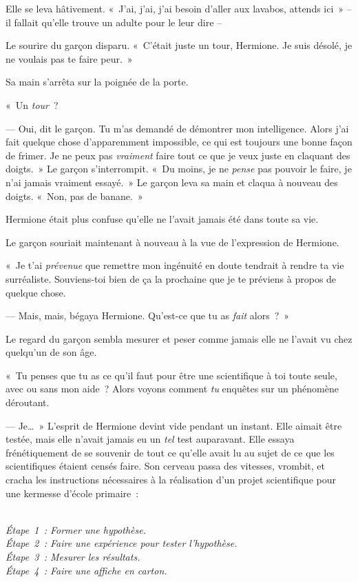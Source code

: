 Elle se leva hâtivement. «~J'ai, j'ai, j'ai besoin d'aller aux lavabos, attends ici~» -- il fallait qu'elle trouve un adulte pour le leur dire --

Le sourire du garçon disparu. «~C'était juste un tour, Hermione. Je suis désolé, je ne voulais pas te faire peur.~»

Sa main s'arrêta sur la poignée de la porte.

«~Un \emph{tour}~?

--- Oui, dit le garçon. Tu m'as demandé de démontrer mon intelligence. Alors j'ai fait quelque chose d'apparemment impossible, ce qui est toujours une bonne façon de frimer. Je ne peux pas \emph{vraiment} faire tout ce que je veux juste en claquant des doigts.~» Le garçon s'interrompit. «~Du moins, je ne \emph{pense} pas pouvoir le faire, je n'ai jamais vraiment essayé.~» Le garçon leva sa main et claqua à nouveau des doigts. «~Non, pas de banane.~»

Hermione était plus confuse qu'elle ne l'avait jamais été dans toute sa vie.

Le garçon souriait maintenant à nouveau à la vue de l'expression de Hermione.

«~Je t'ai \emph{prévenue} que remettre mon ingénuité en doute tendrait à rendre ta vie surréaliste. Souviens-toi bien de ça la prochaine que je te préviens à propos de quelque chose.

--- Mais, mais, bégaya Hermione. Qu'est-ce que tu as \emph{fait} alors~?~»

Le regard du garçon sembla mesurer et peser comme jamais elle ne l'avait vu chez quelqu'un de son âge.

«~Tu penses que tu as ce qu'il faut pour être une scientifique à toi toute seule, avec ou sans mon aide~? Alors voyons comment \emph{tu} enquêtes sur un phénomène déroutant.

--- Je…~» L'esprit de Hermione devint vide pendant un instant. Elle aimait être testée, mais elle n'avait jamais eu un \emph{tel} test auparavant. Elle essaya frénétiquement de se souvenir de tout ce qu'elle avait lu au sujet de ce que les scientifiques étaient censés faire. Son cerveau passa des vitesses, vrombit, et cracha les instructions nécessaires à la réalisation d'un projet scientifique pour une kermesse d'école primaire~:

\emph{\\ 
Étape~1~: Former une hypothèse.\\
Étape~2~: Faire une expérience pour tester l'hypothèse.\\
Étape~3~: Mesurer les résultats.\\
Étape~4~: Faire une affiche en carton.\\
}

